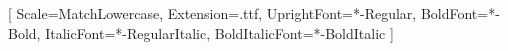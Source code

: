 \usepackage{fontspec}
\setmonofont{JuliaMono}[
  Scale=MatchLowercase,
  Extension=.ttf,
  UprightFont=*-Regular,
  BoldFont=*-Bold,
  ItalicFont=*-RegularItalic,
  BoldItalicFont=*-BoldItalic
]
